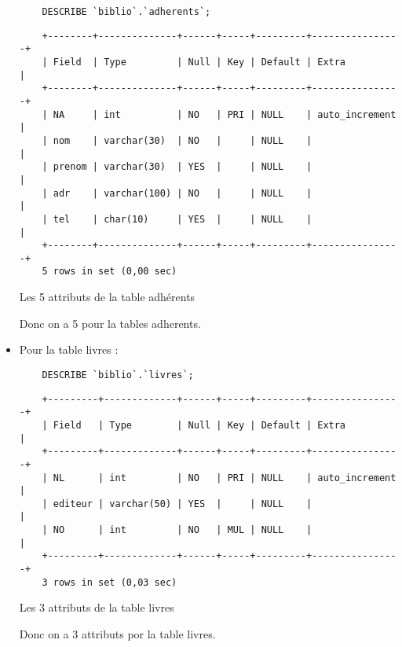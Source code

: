 \documentclass{article}
\begin{document}
\begin{itemize}
\begin{listing}[H]
		      \begin{verbatim}
	DESCRIBE `biblio`.`adherents`;
	\end{verbatim}
\begin{verbatim}
	+--------+--------------+------+-----+---------+----------------+
	| Field  | Type         | Null | Key | Default | Extra          |
	+--------+--------------+------+-----+---------+----------------+
	| NA     | int          | NO   | PRI | NULL    | auto_increment |
	| nom    | varchar(30)  | NO   |     | NULL    |                |
	| prenom | varchar(30)  | YES  |     | NULL    |                |
	| adr    | varchar(100) | NO   |     | NULL    |                |
	| tel    | char(10)     | YES  |     | NULL    |                |
	+--------+--------------+------+-----+---------+----------------+
	5 rows in set (0,00 sec)
	\end{verbatim}
		      \caption{Les 5 attributs de la table adhérents}
	      \end{listing}
	      Donc on a 5 pour la tables adherents.
	\item Pour la table livres :
	      \begin{listing}[H]
		      \begin{verbatim}
	DESCRIBE `biblio`.`livres`;
	\end{verbatim}
		      \begin{verbatim}
	+---------+-------------+------+-----+---------+----------------+
	| Field   | Type        | Null | Key | Default | Extra          |
	+---------+-------------+------+-----+---------+----------------+
	| NL      | int         | NO   | PRI | NULL    | auto_increment |
	| editeur | varchar(50) | YES  |     | NULL    |                |
	| NO      | int         | NO   | MUL | NULL    |                |
	+---------+-------------+------+-----+---------+----------------+
	3 rows in set (0,03 sec)
	\end{verbatim}
		      \caption{Les 3 attributs de la table livres}
	      \end{listing}
	      Donc on a 3 attributs por la table livres.


\end{itemize}
\end{document}
